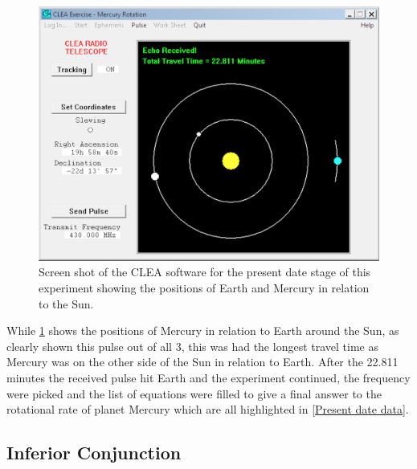 \documentclass[11pt]{article}
\begin{document}
\begin{multicols}{2}
\begin{figure}[H]
\centering
\includegraphics[scale=0.4]{Present_Images.png/CLEA_Software.png}
\caption{Screen shot of the CLEA software for the present date stage of this experiment showing the positions of Earth and Mercury in relation to the Sun.}
\label{1-CLEA Software}
\end{figure}

While \cref{1-CLEA Software} shows the positions of Mercury in relation to Earth around the Sun, as clearly shown this pulse out of all 3, this was had the longest travel time as Mercury was on the other side of the Sun in relation to Earth. After the 22.811 minutes the received pulse hit Earth and the experiment continued, the frequency were picked and the list of equations were filled to give a final answer to the rotational rate of planet Mercury which are all highlighted in \cref{Present date data}. 


\subsection{Inferior Conjunction}


\end{multicols}
\end{document}
